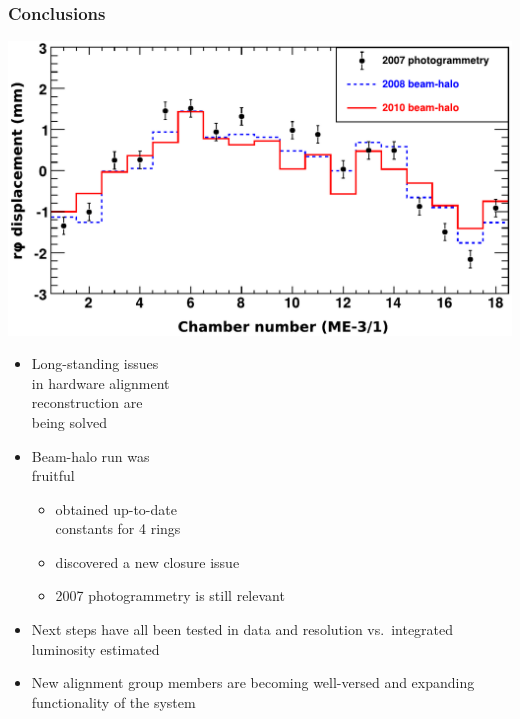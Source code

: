 \documentclass[compress]{beamer}
\begin{document}
\begin{frame}
\frametitle{Conclusions}

\vspace{0.25 cm}
\hfill \includegraphics[width=0.6\linewidth]{compare_m31_x.pdf}

\vspace{-3.5 cm}
\begin{itemize}
\item Long-standing issues \\ in hardware alignment \\ reconstruction are \\ being solved

\item Beam-halo run was \\ fruitful
\begin{itemize}
\item obtained up-to-date \\ constants for 4 rings
\item discovered a new closure issue
\item 2007 photogrammetry is still relevant
\end{itemize}

\item Next steps have all been tested in data and resolution vs.\ integrated luminosity estimated

\item New alignment group members are becoming well-versed and expanding functionality of the system
\end{itemize}

\label{numpages}
\end{frame}
\end{document}
